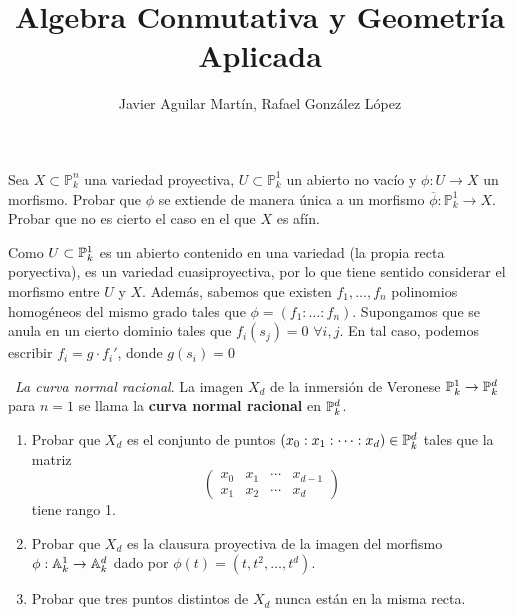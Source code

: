 \documentclass[twoside]{article}
\begin{document}
\title{Algebra Conmutativa y Geometría Aplicada}
\author{Javier Aguilar Martín, Rafael González López}
\maketitle
\begin{ejercicio}{2} Sea $X \subset \mathbb{P}^n_k$ una variedad proyectiva, $U\subset \mathbb{P}^1_k$ un abierto no vacío y $\phi\colon U\rightarrow X$ un morfismo. Probar que $\phi$ se extiende de manera única a un morfismo $\overline{\phi}\colon \mathbb{P}^1_k\rightarrow X$. Probar que no es cierto el caso en el que $X$ es afín.
\end{ejercicio}
\begin{solucion}
Como $U\subset \mathbb{P}^1_k$ es un abierto contenido en una variedad (la propia recta poryectiva), es un variedad cuasiproyectiva, por lo que tiene sentido considerar el morfismo entre $U$ y $X$. Además, sabemos que existen $f_1,\dotsc,f_n$ polinomios homogéneos del mismo grado tales que $\phi = (f_1 : \dotsc : f_n)$. Supongamos que se anula en un cierto dominio tales que $f_i(s_j)=0$ $\forall i,j$. En tal caso, podemos escribir $f_i = g\cdot f_i'$, donde $g(s_i)=0$
\end{solucion}
\newpage 
\begin{ejercicio}{5}\
\emph{La curva normal racional}. La imagen $X_d$ de la inmersión de
Veronese $\mathbb{P}^1_k \to \mathbb{P}^d_k$ para $n = 1$ se llama la \textbf{curva normal racional} en $\mathbb{P}^d_k$.
\begin{enumerate}
\item Probar que $X_d$ es el conjunto de puntos $(x_0 : x_1 : \dots : x_d) \in \mathbb{P}^d_k$ tales que
la matriz 
\[
\begin{pmatrix}
x_0 & x_1 &\cdots& x_{d-1}\\
x_1 & x_2 &\cdots& x_d
\end{pmatrix}
\]
tiene rango 1.
\item Probar que $X_d$ es la clausura proyectiva de la imagen del morfismo $\phi :\mathbb{A}^1_k \to \mathbb{A}^d_k$ dado por $\phi(t) = (t, t^2, \dots , t^d)$.
\item Probar que tres puntos distintos de $X_d$ nunca están en la misma recta.
\end{enumerate}
\end{ejercicio}
\begin{solucion}\

\end{solucion}
\newpage 
\end{document}
